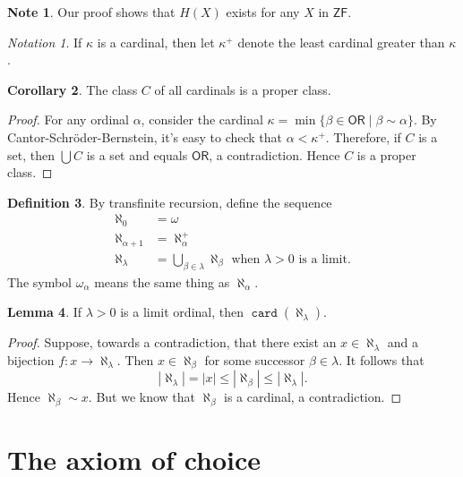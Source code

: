 \documentclass[10pt,letterpaper,cm]{nupset}
\theoremstyle{definition}
\newtheorem{definition}{Definition}[subsection]
\newtheorem{note}[definition]{Note}
\theoremstyle{theorem}
\newtheorem{lemma}[definition]{Lemma}
\newtheorem{corollary}[definition]{Corollary}
\theoremstyle{remark}
\newtheorem*{notation}{Notation}
\newcommand{\1}{\mathbf{1}}
\newcommand{\0}{\vec 0}
\newcommand{\zf}{\mathsf{ZF}}
\newcommand{\ord}{\mathsf{OR}}
\DeclareMathOperator{\card}{\mathtt{card}}
\begin{document}
\begin{note}
Our proof shows that $H(X)$ exists for any $X$ in $\zf$.
\end{note}

\begin{notation}
If $\kappa$ is a cardinal, then let $\kappa^+$ denote the least cardinal greater than $\kappa$. 
\end{notation}


\begin{corollary}
The class $C$ of all cardinals is a proper class.
\end{corollary}
\begin{proof}
For any ordinal $\alpha$, consider the cardinal $\kappa = \min\{\beta \in \ord \mid \beta \sim \alpha\}$. By Cantor-Schr\"oder-Bernstein, it's easy to check that $\alpha < \kappa^+$. Therefore,  if $C$ is a set, then $\bigcup{C}$ is a set and equals $\ord$, a contradiction. Hence $C$ is a proper class.
\end{proof}

\begin{definition}
By transfinite recursion, define the sequence
\begin{align*}
\aleph_0 & = \omega
\\ \aleph_{\alpha +1} & =\aleph_{\alpha}^+
\\ \aleph_{\lambda} & = \bigcup_{\beta \in \lambda} \aleph_{\beta} \text{ when }\lambda >0 \text{ is a limit.}
\end{align*}   The symbol $\omega_{\alpha}$ means the same thing as $\aleph_{\alpha}$.
\end{definition}

\begin{lemma}
If $\lambda >0$ is a limit ordinal, then $\card(\aleph_{\lambda})$.
\end{lemma}
\begin{proof}
Suppose, towards a contradiction, that there exist  an $x\in \aleph_{\lambda}$ and a bijection $f: x \to \aleph_{\lambda}$. Then $x\in \aleph_{\beta}$ for some successor $\beta \in \lambda$. It follows that $$\left\lvert{ \aleph_{\lambda}  }\right\rvert = \left\lvert{ x  }\right\rvert \leq \left\lvert{  \aleph_{\beta} }\right\rvert \leq \left\lvert{ \aleph_{\lambda}  }\right\rvert .$$ Hence $ \aleph_{\beta} \sim x$. But we know that $\aleph_{\beta} $ is a cardinal, a contradiction. 
\end{proof}

\section{The axiom of choice}
\end{document}
